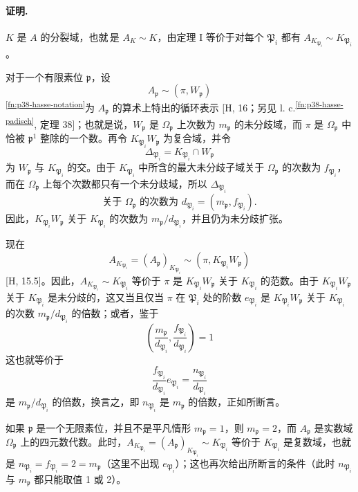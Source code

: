 \paragraph{证明.}
\(K\) 是 \(A\) 的分裂域，也就\,是 \(A_K\sim K\)，由定理 I 等价于对每个 \(\mathfrak P_i\) 都有 \(A_{K_{\mathfrak P_i}}\sim K_{\mathfrak P_i}\)。

对于一个有限素位 \(\mathfrak p\)，设
\[
        A_{\mathfrak p}\sim(\pi,W_{\mathfrak p})
\]
\textsuperscript{\ref{fn:p38-hasse-notation}}为 \(A_{\mathfrak p}\) 的算术上特出的循环表示 [H, 16；另见 l. c.\textsuperscript{\ref{fn:p38-hasse-padisch}}, 定理 38]；也就是说，\(W_{\mathfrak p}\) 是 \(\Omega_{\mathfrak p}\) 上次数为 \(m_{\mathfrak p}\) 的未分歧域，而 \(\pi\) 是 \(\Omega_{\mathfrak p}\) 中恰被 \(\mathfrak p^1\) 整除的一个数。再令 \(K_{\mathfrak P_i}W_{\mathfrak p}\) 为复合域，并令
\[
        \Delta_{\mathfrak P_i}=K_{\mathfrak P_i}\cap W_{\mathfrak p}
\]
为 \(W_{\mathfrak p}\) 与 \(K_{\mathfrak P_i}\) 的交。由于 \(K_{\mathfrak P_i}\) 中所含的最大未分歧子域关于 \(\Omega_{\mathfrak p}\) 的次数为 \(f_{\mathfrak P_i}\)，而在 \(\Omega_{\mathfrak p}\) 上每个次数都只有一个未分歧域，所以 \(\Delta_{\mathfrak P_i}\)
\[
        \text{关于 }\Omega_{\mathfrak p}\text{ 的次数为 }d_{\mathfrak P_i}=(m_{\mathfrak p},f_{\mathfrak P_i}).
\]
因此，\(K_{\mathfrak P_i}W_{\mathfrak p}\) 关于 \(K_{\mathfrak P_i}\) 的次数为 \(m_{\mathfrak p}/d_{\mathfrak P_i}\)，并且仍为未分歧扩张。

现在
\[
        A_{K_{\mathfrak P_i}}=(A_{\mathfrak p})_{K_{\mathfrak P_i}}\sim(\pi,K_{\mathfrak P_i}W_{\mathfrak p})
\]
[H, 15.5]。因此，\(A_{K_{\mathfrak P_i}}\sim K_{\mathfrak P_i}\) 等价于 \(\pi\) 是 \(K_{\mathfrak P_i}W_{\mathfrak p}\) 关于 \(K_{\mathfrak P_i}\) 的范数。由于 \(K_{\mathfrak P_i}W_{\mathfrak p}\) 关于 \(K_{\mathfrak P_i}\) 是未分歧的，这又当且仅当 \(\pi\) 在 \(\mathfrak P_i\) 处的阶数 \(e_{\mathfrak P_i}\) 是 \(K_{\mathfrak P_i}W_{\mathfrak p}\) 关于 \(K_{\mathfrak P_i}\) 的次数 \(m_{\mathfrak p}/d_{\mathfrak P_i}\) 的倍数；或者，鉴于
\[
\left(\frac{m_{\mathfrak p}}{d_{\mathfrak P_i}},\frac{f_{\mathfrak P_i}}{d_{\mathfrak P_i}}\right)=1
\]
这也就等价于
\[
\frac{f_{\mathfrak P_i}}{d_{\mathfrak P_i}}e_{\mathfrak P_i}=\frac{n_{\mathfrak P_i}}{d_{\mathfrak P_i}}
\]
是 \(m_{\mathfrak p}/d_{\mathfrak P_i}\) 的倍数，换言之，即 \(n_{\mathfrak P_i}\) 是 \(m_{\mathfrak p}\) 的倍数，正如所断言。

如果 \(\mathfrak p\) 是一个无限素位，并且不是平凡情形 \(m_{\mathfrak p}=1\)，则 \(m_{\mathfrak p}=2\)，而 \(A_{\mathfrak p}\) 是实数域 \(\Omega_{\mathfrak p}\) 上的四元数代数。此时，\(A_{K_{\mathfrak P_i}}=(A_{\mathfrak p})_{K_{\mathfrak P_i}}\sim K_{\mathfrak P_i}\) 等价于 \(K_{\mathfrak P_i}\) 是复数域，也就是 \(n_{\mathfrak P_i}=f_{\mathfrak P_i}=2=m_{\mathfrak p}\)（这里不出现 \(e_{\mathfrak P_i}\)）；这也再次给出所断言的条件（此时 \(n_{\mathfrak P_i}\) 与 \(m_{\mathfrak p}\) 都只能取值 1 或 2）。
